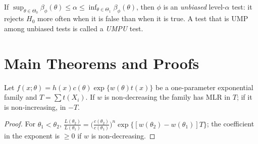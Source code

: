 \documentclass[main.tex]{subfiles}
\begin{document}
\begin{definition}
If $\sup_{\theta\in\Theta_0}\beta_\phi(\theta)\le\alpha\le\inf_{\theta\in\Theta_1}\beta_\phi(\theta)$, then $\phi$ is an \emph{unbiased} level-$\alpha$ test: it rejects $H_0$ more often when it is false than when it is true. A test that is UMP among unbiased tests is called a \emph{UMPU} test.
\end{definition}

\section{Main Theorems and Proofs}

\begin{proposition}\label{prop:ustel-mlr}
Let $f(x;\theta)=h(x)c(\theta)\exp\{w(\theta)t(x)\}$ be a one-parameter exponential family and $T=\sum t(X_i)$. If $w$ is non-decreasing the family has MLR in $T$; if it is non-increasing, in $-T$.
\end{proposition}
\begin{proof}
For $\theta_1<\theta_2$, $\frac{L(\theta_2)}{L(\theta_1)}=\Big(\frac{c(\theta_2)}{c(\theta_1)}\Big)^n\exp\{[w(\theta_2)-w(\theta_1)]T\}$; the coefficient in the exponent is $\ge0$ if $w$ is non-decreasing.
\end{proof}
\end{document}
